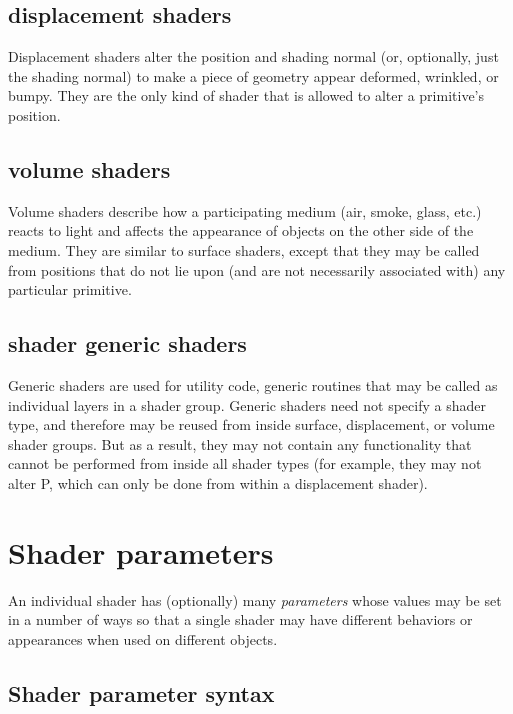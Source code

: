 \documentclass[11pt,letterpaper]{book}
\def\P{{\cf P}\xspace}
\begin{document}
\subsection*{{\cf displacement} shaders}

Displacement shaders alter the position and shading normal (or,
optionally, just the shading normal) to make a piece of geometry appear
deformed, wrinkled, or bumpy.  They are the only kind of shader that
is allowed to alter a primitive's position.

\subsection*{{\cf volume} shaders}

Volume shaders describe how a participating medium (air, smoke, glass,
etc.) reacts to light and affects the appearance of objects on the other
side of the medium.  They are similar to {\cf surface} shaders, except
that they may be called from positions that do not lie upon (and are not
necessarily associated with) any particular primitive.



\subsection*{{\cf shader} generic shaders}

Generic shaders are used for utility code, generic routines that may be
called as individual layers in a shader group.  Generic shaders need not
specify a shader type, and therefore may be reused from inside surface,
displacement, or volume shader groups.  But as a result, they may
not contain any functionality that cannot be performed from inside all
shader types (for example, they may not alter \P, which can only be done
from within a displacement shader).


\section{Shader parameters}
\label{sec:shaderparams}
 

An individual shader has (optionally) many \emph{parameters} whose
values may be set in a number of ways so that a single shader may have
different behaviors or appearances when used on different objects.

\subsection{Shader parameter syntax}
\end{document}
